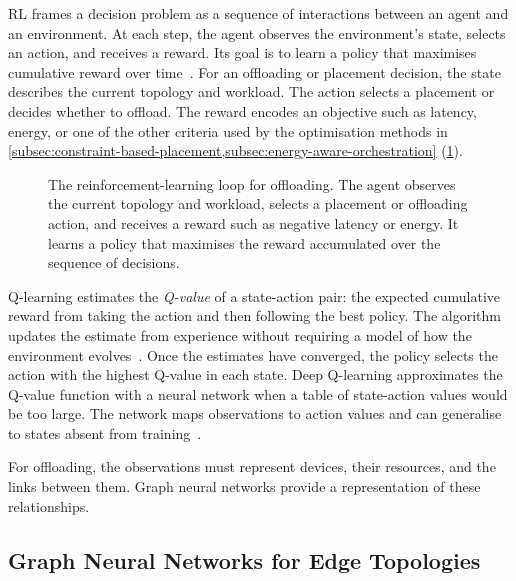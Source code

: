 \ac{RL} frames a decision problem as a sequence of interactions between an agent and an environment.
At each step, the agent observes the environment's state, selects an action, and receives a reward.
Its goal is to learn a policy that maximises cumulative reward over time~\cite{DBLP:books/lib/SuttonB18}.
%
For an offloading or placement decision, the state describes the current topology and workload.
The action selects a placement or decides whether to offload.
The reward encodes an objective such as latency, energy, or one of the other criteria used by the optimisation methods in \cref{subsec:constraint-based-placement,subsec:energy-aware-orchestration} (\cref{fig:rl-offloading-loop}).

\begin{figure}[t]
    \centering
    
    \caption[The reinforcement-learning loop for offloading]{The reinforcement-learning loop for offloading. The agent observes the current topology and workload, selects a placement or offloading action, and receives a reward such as negative latency or energy. It learns a policy that maximises the reward accumulated over the sequence of decisions.}
    \label{fig:rl-offloading-loop}
\end{figure}

%
Q-learning estimates the \emph{Q-value} of a state-action pair:
the expected cumulative reward from taking the action and then following the best policy.
The algorithm updates the estimate from experience without requiring a model of how the environment evolves~\cite{DBLP:journals/ml/WatkinsD92}.
%
Once the estimates have converged, the policy selects the action with the highest Q-value in each state.
%
Deep Q-learning approximates the Q-value function with a neural network when a table of state-action values would be too large.
The network maps observations to action values and can generalise to states absent from training~\cite{DBLP:journals/nature/MnihKSRVBGRFOPB15}.

For offloading, the observations must represent devices, their resources, and the links between them.
Graph neural networks provide a representation of these relationships.

\subsection{Graph Neural Networks for Edge Topologies}
\label{subsec:gnns-for-edge}

